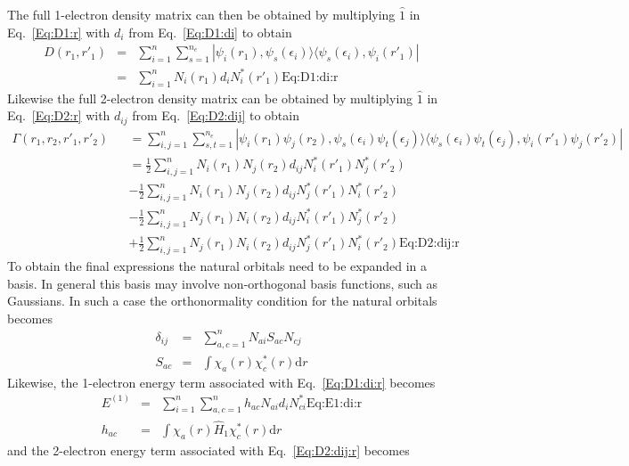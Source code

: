 \documentclass[pra,nofootinbib]{revtex4-1}
\newcommand{\nel}{{n_{e}}}
\newcommand{\dlabel}[1]{\text{#1}\label{#1}}
\begin{document}
The full 1-electron density matrix can then be obtained by multiplying $\hat{1}$ in Eq.~\ref{Eq:D1:r}
with $d_i$ from Eq.~\ref{Eq:D1:di} to obtain
\begin{eqnarray}
  D(r_1,r'_1) 
  &=& \sum_{i=1}^{n}\sum_{s=1}^\nel
      |\psi_i(r_1),\psi_s(\epsilon_i)\rangle \langle\psi_s(\epsilon_i),\psi_i(r'_1)| \\
  &=& \sum_{i=1}^{n} N_i(r_1) d_i N_i^*(r'_1) \dlabel{Eq:D1:di:r}
\end{eqnarray}
Likewise the full 2-electron density matrix can be obtained
by multiplying $\hat{1}$ in Eq.~\ref{Eq:D2:r} with $d_{ij}$ from Eq.~\ref{Eq:D2:dij} to obtain
\begin{eqnarray}
  \Gamma(r_1,r_2,r'_1,r'_2)
  &&= \sum_{i,j=1}^{n}\sum_{s,t=1}^\nel
      |\psi_i(r_1)\psi_j(r_2),\psi_s(\epsilon_i)\psi_t(\epsilon_j)\rangle
      \langle\psi_s(\epsilon_i)\psi_t(\epsilon_j),\psi_i(r'_1)\psi_j(r'_2)| 
      \\
  &&= \frac{1}{2}\sum_{i,j=1}^{n} N_i(r_1)N_j(r_2) d_{ij} N_i^*(r'_1)N_j^*(r'_2) \nonumber \\
  &&- \frac{1}{2}\sum_{i,j=1}^{n} N_i(r_1)N_j(r_2) d_{ij} N_j^*(r'_1)N_i^*(r'_2) \nonumber \\
  &&- \frac{1}{2}\sum_{i,j=1}^{n} N_j(r_1)N_i(r_2) d_{ij} N_i^*(r'_1)N_j^*(r'_2) \nonumber \\
  &&+ \frac{1}{2}\sum_{i,j=1}^{n} N_j(r_1)N_i(r_2) d_{ij} N_j^*(r'_1)N_i^*(r'_2) \dlabel{Eq:D2:dij:r}
\end{eqnarray}
To obtain the final expressions the natural orbitals need to be expanded in a basis.
In general this basis may involve non-orthogonal basis functions, such as Gaussians.
In such a case the orthonormality condition for the natural orbitals becomes
\begin{eqnarray}
  \delta_{ij} &=& \sum_{a,c=1}^{n} N_{ai}S_{ac} N_{cj} \\
  S_{ac} &=& \int \chi_a(r) \chi^*_c(r) \mathrm{d}r
\end{eqnarray}
Likewise, the 1-electron energy term associated with Eq.~\ref{Eq:D1:di:r} becomes
\begin{eqnarray}
  E^{(1)}
  &=& \sum_{i=1}^{n} \sum_{a,c=1}^{n} h_{ac} N_{ai} d_i N_{ci}^* \dlabel{Eq:E1:di:r} \\
  h_{ac}
  &=& \int \chi_a(r) \hat{H}_{1} \chi^*_c(r) \mathrm{d}r
\end{eqnarray}
and the 2-electron energy term associated with Eq.~\ref{Eq:D2:dij:r} becomes
\end{document}
